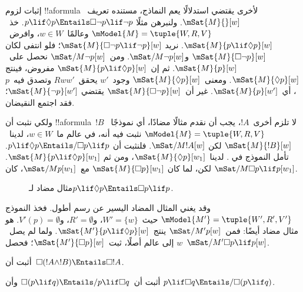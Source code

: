 \documentclass[../../../include/open-logic-section]{subfiles}
\begin{document}
\begin{ex}
  إثبات لزوم !!a{formula} لأخرى يقتضي استدلالًا يعم النماذج،
  مستنده تعريف~$\mSat{M}{}[w]$. ولنبرهن مثلًا
  $p \lif \Diamond p \Entails \Box\lnot p \lif \lnot p$.
  خذ~$\mModel{M} = \tuple{W, R, V}$ وعالمًا~$w \in W$،
  وافرض~$\mSat{M}{p \lif \Diamond p}[w]$. نريد
  $\mSat{M}{\Box\lnot p \lif \lnot p}[w]$؛ فلو انتفى لكان
  $\mSat{M}{\Box\lnot p}[w]$ و$\mSat/{M}{\lnot p}[w]$.
  ومن~$\mSat/{M}{\lnot p}[w]$ نحصل على~$\mSat{M}{p}[w]$.
  ثم إن~$\mSat{M}{p \lif \Diamond p}[w]$ مفروض، فينتج
  $\mSat{M}{\Diamond p}[w]$. ومعنى~$\mSat{M}{\Diamond p}[w]$
  وجود~$w'$ يحقق~$Rww'$ وتصدق فيه~$p$، أي~$\mSat{M}{p}[w']$.
  غير أن~$\mSat{M}{\Box \lnot p}[w]$ يقتضي
  $\mSat{M}{\lnot p}[w']$؛ فقد اجتمع النقيضان.

  ولكي نثبت أن !!a{formula}~$!B$ لا تلزم أخرى~$!A$، يجب أن نقدم
  مثالًا مضادًا، أي نموذجًا~$\mModel{M} = \tuple{W, R, V}$ نثبت فيه
  أنه، في عالم ما~$w \in W$، لدينا~$\mSat{M}{!B}[w]$ لكن
  $\mSat/{M}{!A}[w]$. فلنثبت أن
  $p \lif \Diamond p \Entails/ \Box p \lif p$. تأمل النموذج في
  . لدينا~$\mSat{M}{\Diamond p}[w_1]$، ومن ثم
  $\mSat{M}{p \lif \Diamond p}[w_1]$. لكن، لما كان
  $\mSat{M}{\Box p}[w_1]$ مع~$\mSat/{M}{p}[w_1]$، كان
  $\mSat/{M}{\Box p \lif p}[w_1]$.
  \begin{figure}
  \begin{center}
  \end{center}
  \caption{مثال مضاد لـ$p \lif \Diamond p
  \Entails \Box p \lif p$.}
  \end{figure}

  وقد يغني المثال المضاد اليسير عن رسم أطول. فخذ النموذج
  $\mModel{M'} = \tuple{W', R', V'}$ حيث~$W' = \{w\}$،
  و$R' = \emptyset$، و$V'(p) = \emptyset$. هو مثال مضاد أيضًا:
  فمن~$\mSat/{M'}{p}[w]$ ينتج~$\mSat{M'}{p \lif \Diamond p}[w]$.
  ولما لم يصل~$w$ إلى عالم أصلًا، ثبت~$\mSat{M'}{\Box p}[w]$؛
  فحصل~$\mSat/{M'}{\Box p \lif p}[w]$.
\end{ex}

\begin{prob}
  أثبت أن~$\Box (!A \land !B) \Entails \Box !A$.
\end{prob}

\begin{prob}
  أثبت أن~$\Box (p \lif q) \Entails/ p \lif \Box q$ وأن
  $p \lif \Box q \Entails/\Box (p \lif q)$.
\end{prob}
\end{document}
